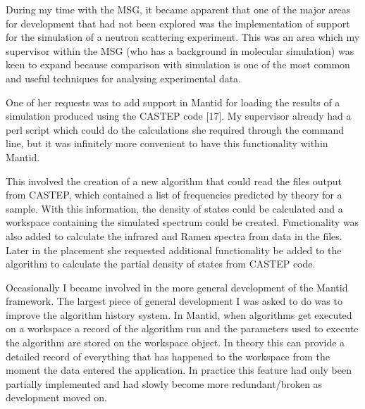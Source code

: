 \documentclass[paper=a4, fontsize=11pt]{scrartcl}	%
\numberwithin{equation}{section}															%
\numberwithin{figure}{section}																%
\numberwithin{table}{section}
\begin{document}
During my time with the MSG, it became apparent that one of the major
areas for development that had not been explored was the implementation
of support for the simulation of a neutron scattering experiment. This
was an area which my supervisor within the MSG (who has a background in molecular
simulation) was keen to expand because comparison with simulation is
one of the most common and useful techniques for analysing experimental
data.

One of her requests was to add support in Mantid for loading the results
of a simulation produced using the CASTEP code {[}17{]}. My supervisor
already had a perl script which could do the calculations she required
through the command line, but it was infinitely more convenient to have
this functionality within Mantid.

This involved the creation of a new algorithm that could read the files
output from CASTEP, which contained a list of frequencies predicted by
theory for a sample. With this information, the density of states could
be calculated and a workspace containing the simulated spectrum could be
created. Functionality was also added to calculate the infrared and
Ramen spectra from data in the files. Later in the placement she requested additional functionality be added to the algorithm to
calculate the partial density of states from CASTEP code.


Occasionally I became involved in the more general development of the
Mantid framework. The largest piece of general development I was asked
to do was to improve the algorithm history system. In Mantid, when
algorithms get executed on a workspace a record of the algorithm run and
the parameters used to execute the algorithm are stored on the workspace
object. In theory this can provide a detailed record of everything that
has happened to the workspace from the moment the data entered the
application. In practice this feature had only been partially
implemented and had slowly become more redundant/broken as development
moved on.
\end{document}
